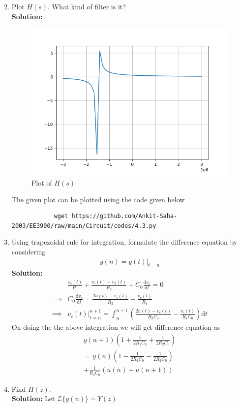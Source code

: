 \documentclass[journal,12pt,twocolumn]{IEEEtran}
\newcommand{\solution}{\noindent \textbf{Solution: }}
\providecommand{\brak}[1]{\ensuremath{\left(#1\right)}}
\providecommand{\der}[1]{\mathrm{d} #1}
\providecommand{\z}[1]{{\mathcal{Z}}\{#1\}}
\numberwithin{equation}{section}
\renewcommand\thesection{\arabic{section}}
\begin{document}
\begin{enumerate}[label=\arabic*.,ref=\thesection.\theenumi]
\begin{equation}
		\end{equation}
	\item Plot $H(s)$.  What kind of filter is it?\\
		\solution 
		\begin{figure}[!ht]
			\centering
			\includegraphics[width=\columnwidth]{../figs/Hs.png}
			\caption{Plot of $H(s)$}
			\label{fig-4.3}	
		\end{figure}
		The given plot can be plotted using the code given below
		\begin{lstlisting}
			wget https://github.com/Ankit-Saha-2003/EE3900/raw/main/Circuit/codes/4.3.py
		\end{lstlisting}
	\item Using trapezoidal rule for integration, formulate the difference equation
			by considering 
		\begin{align}
			y(n) = y(t)\vert_{t=n}
		\end{align}
		\solution
	\begin{align}
		&\frac{v_c(t)}{R_1} + \frac{v_c(t) - v_2(t)}{R_2} + C_0\frac{\der{v_c}}{\der{t}} = 0 \\
		\implies &C_0\frac{\der{v_c}}{\der{t}} = \frac{2u(t)-v_c(t)}{R_2} - \frac{v_c(t)}{R_1} \\
		\implies &\left.v_c(t)\right|_{t=n}^{n+1} = \int_{n}^{n+1} \brak{\frac{2u(t)-v_c(t)}{R_2C_0} - \frac{v_c(t)}{R_1C_0}} \der{t}
	\end{align}
	On doing the the above integration we will get difference equation as\\
	\begin{multline}
		y(n+1) \brak{1 + \frac{1}{2R_1C_0} + \frac{1}{2R_2C_0}} \\= y(n) \brak{1 - \frac{1}{2R_1C_0} - \frac{1}{2R_2C_0}} \\+ \frac{1}{R_2C_0}\brak{u(n)+u(n+1)}
	\end{multline}
	\item Find $H(z)$.\\
	\solution Let $\z{y(n)} = Y(z)$
	

\end{enumerate}
\end{document}
